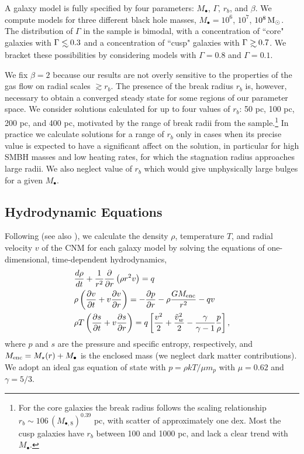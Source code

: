 \documentclass[usenatbib,fleqn]{mn2e}
\newcommand\lsim{\mathrel{\rlap{\lower4pt\hbox{\hskip1pt$\sim$}}
    \raise1pt\hbox{$<$}}}
\newcommand\gsim{\mathrel{\rlap{\lower4pt\hbox{\hskip1pt$\sim$}}
    \raise1pt\hbox{$>$}}}
\newcommand{\rb}{r_b}
\newcommand{\dxdy}[2]{\frac{d #1}{d #2} }
\newcommand{\drhodt}{\dxdy{\rho}{t}}
\newcommand{\ke}{\frac{v^2}{2}}
\newcommand{\kew}{\frac{\tilde{v}_{w}^2}{2}}
\newcommand{\gammaf}{\frac{\gamma}{\gamma-1}}
\newcommand{\cs}{\frac{p}{\rho}}
\newcommand{\Mbh}[1][]{M_{\bullet#1}}
\newcommand{\Mbheight}{M_{\bullet,8}}
\begin{document}
A galaxy model is fully specified by four parameters: $\Mbh$,
$\Gamma$, $r_b$, and $\beta$.  We compute models for three different
black hole masses, $\Mbh = 10^6$, $10^7$, $10^8 \,{\rm M_\odot}$.  The
distribution of $\Gamma$ in the \citet{LauerFaber+:2007a} sample is
bimodal, with a concentration of ``core" galaxies with $\Gamma \lsim
0.3$ and a concentration of ``cusp" galaxies with $\Gamma \gsim 0.7$.
We bracket these possibilities by considering models with $\Gamma=0.8$
and $\Gamma=0.1$.  

We fix $\beta = 2$ because our results are not overly sensitive to the properties of the gas flow on radial scales $\gtrsim r_b$. The presence of the break radius $r_{b}$ is,
however, necessary to obtain a converged steady state for some regions
of our parameter space.  We consider solutions calculated for up to
four values of $\rb$: 50 pc, 100 pc, 200 pc, and 400 pc, motivated by
the range of break radii from the \citet{LauerFaber+:2007a}
sample.\footnote{For the core galaxies the break radius follows the
  scaling relationship $\rb\sim 106 \, (\Mbheight)^{0.39}$ pc, with
  scatter of approximately one dex.  Most the cusp galaxies have $\rb$
  between 100 and 1000 pc, and lack a clear trend with $\Mbh$.}  In
practice we calculate solutions for a range of $\rb$ only in cases
when its precise value is expected to have a significant affect on the
solution, in particular for high SMBH masses and low heating rates,
for which the stagnation radius approaches large radii. We also
neglect value of $r_b$ which would give unphysically large bulges for
a given $\Mbh$.


\subsection{Hydrodynamic Equations}
\label{sec:hydro}

Following \citet{Quataert:2004a} (see also
\citealt{HolzerAxford:1970a,De-ColleGuillochon+:2012a,ShcherbakovWong+:2014a}),
we calculate the density $\rho$, temperature $T$, and radial velocity
$v$ of the CNM for each galaxy model by solving the equations of
one-dimensional, time-dependent hydrodynamics,
\begin{align}
  &\drhodt+\frac{1}{r^2}\frac{\partial}{\partial r}\left(\rho r^2 v\right)=q \label{eq:drhodt}\\
  &\rho \left(\frac{\partial v}{\partial t} + v\frac{\partial
      v}{\partial r}\right) =-\frac{\partial p}{\partial r}- \rho\frac{GM_{\rm enc}}{r^{2}} -q v \label{eq:dvdt}\\
  &\rho T\left(\frac{\partial s}{\partial t} + v\frac{\partial
      s}{\partial r}\right)=q\left[\ke+\kew-\gammaf \cs \right] 
, 
\label{eq:dsdt}
\end{align}
where $p$ and $s$ are the pressure and specific entropy, respectively, and $M_{\rm enc} = M_{\star}(r) + \Mbh$ is the
enclosed mass (we neglect dark matter contributions).  We adopt an ideal gas equation of state with $p = \rho kT/\mu m_p$ with $\mu = 0.62$  and $\gamma = 5/3$. 
\end{document}

